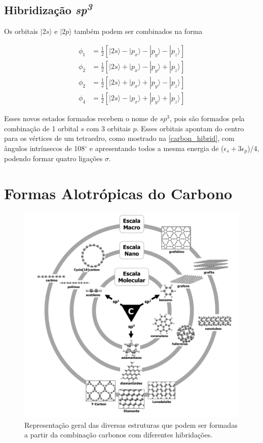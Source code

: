	\subsection{Hibridização \textit{sp\textsuperscript{3}}}
	
		Os orbitais $|2s\rangle$ e $|2p\rangle$ também podem ser combinados na forma
		
		\begin{subequations}
			\label{sp3hibrid}
			\begin{flalign}
			\phi_1& = \frac{1}{2}\left[|2s\rangle - |p_x\rangle - |p_y\rangle - |p_z\rangle\right]\\
			\phi_2& = \frac{1}{2}\left[|2s\rangle + |p_x\rangle - |p_y\rangle + |p_z\rangle\right]\\
			\phi_2& = \frac{1}{2}\left[|2s\rangle + |p_x\rangle + |p_y\rangle - |p_z\rangle\right]\\
			\phi_4& = \frac{1}{2}\left[|2s\rangle - |p_x\rangle + |p_y\rangle + |p_z\rangle\right]
			\end{flalign}
		\end{subequations}
		
		Esses novos estados formados recebem o nome de $sp^3$, pois são formados pela combinação de 1 orbital $s$ com 3 orbitais $p$. Esses orbitais apontam do centro para os vértices de um tetraedro, como mostrado na \autoref{carbon_hibrid}, com ângulos intrínsecos de 108$^\circ$ e apresentando todos a mesma energia de ($\epsilon_s + 3\epsilon_p$)/4, podendo formar quatro ligações $\sigma$. 
		 
	\section{Formas Alotrópicas do Carbono}

	\begin{figure}[!ht]
		\centering
		\includegraphics[width=.7\linewidth]{capitulos/fig/intro/alotropos_carbono}
		\caption{Representação geral das diversas estruturas que podem ser formadas a partir da combinação carbonos com diferentes hibridações. }
		\label{carbon_alotropes}
	\end{figure}
	
